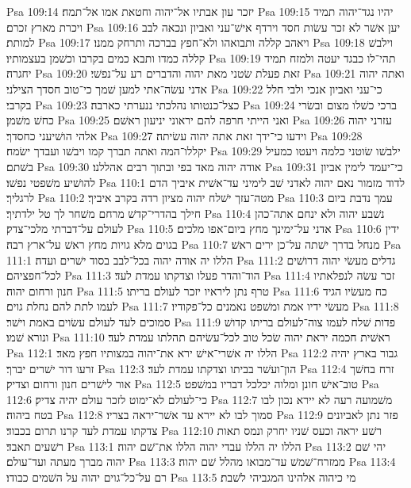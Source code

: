 Psa 109:14  יזכר עון אבתיו אל־יהוה וחטאת אמו אל־תמח׃
Psa 109:15  יהיו נגד־יהוה תמיד ויכרת מארץ זכרם׃
Psa 109:16  יען אשׁר לא זכר עשׂות חסד וירדף אישׁ־עני ואביון ונכאה לבב למותת׃
Psa 109:17  ויאהב קללה ותבואהו ולא־חפץ בברכה ותרחק ממנו׃
Psa 109:18  וילבשׁ קללה כמדו ותבא כמים בקרבו וכשׁמן בעצמותיו׃
Psa 109:19  תהי־לו כבגד יעטה ולמזח תמיד יחגרה׃
Psa 109:20  זאת פעלת שׂטני מאת יהוה והדברים רע על־נפשׁי׃
Psa 109:21  ואתה יהוה אדני עשׂה־אתי למען שׁמך כי־טוב חסדך הצילני׃
Psa 109:22  כי־עני ואביון אנכי ולבי חלל בקרבי׃
Psa 109:23  כצל־כנטותו נהלכתי ננערתי כארבה׃
Psa 109:24  ברכי כשׁלו מצום ובשׂרי כחשׁ משׁמן׃
Psa 109:25  ואני הייתי חרפה להם יראוני יניעון ראשׁם׃
Psa 109:26  עזרני יהוה אלהי הושׁיעני כחסדך׃
Psa 109:27  וידעו כי־ידך זאת אתה יהוה עשׂיתה׃
Psa 109:28  יקללו־המה ואתה תברך קמו ויבשׁו ועבדך ישׂמח׃
Psa 109:29  ילבשׁו שׂוטני כלמה ויעטו כמעיל בשׁתם׃
Psa 109:30  אודה יהוה מאד בפי ובתוך רבים אהללנו׃
Psa 109:31  כי־יעמד לימין אביון להושׁיע משׁפטי נפשׁו׃
Psa 110:1  לדוד מזמור נאם יהוה לאדני שׁב לימיני עד־אשׁית איביך הדם לרגליך׃
Psa 110:2  מטה־עזך ישׁלח יהוה מציון רדה בקרב איביך׃
Psa 110:3  עמך נדבת ביום חילך בהדרי־קדשׁ מרחם משׁחר לך טל ילדתיך׃
Psa 110:4  נשׁבע יהוה ולא ינחם אתה־כהן לעולם על־דברתי מלכי־צדק׃
Psa 110:5  אדני על־ימינך מחץ ביום־אפו מלכים׃
Psa 110:6  ידין בגוים מלא גויות מחץ ראשׁ על־ארץ רבה׃
Psa 110:7  מנחל בדרך ישׁתה על־כן ירים ראשׁ׃
Psa 111:1  הללו יה אודה יהוה בכל־לבב בסוד ישׁרים ועדה׃
Psa 111:2  גדלים מעשׂי יהוה דרושׁים לכל־חפציהם׃
Psa 111:3  הוד־והדר פעלו וצדקתו עמדת לעד׃
Psa 111:4  זכר עשׂה לנפלאתיו חנון ורחום יהוה׃
Psa 111:5  טרף נתן ליראיו יזכר לעולם בריתו׃
Psa 111:6  כח מעשׂיו הגיד לעמו לתת להם נחלת גוים׃
Psa 111:7  מעשׂי ידיו אמת ומשׁפט נאמנים כל־פקודיו׃
Psa 111:8  סמוכים לעד לעולם עשׂוים באמת וישׁר׃
Psa 111:9  פדות שׁלח לעמו צוה־לעולם בריתו קדושׁ ונורא שׁמו׃
Psa 111:10  ראשׁית חכמה יראת יהוה שׂכל טוב לכל־עשׂיהם תהלתו עמדת לעד׃
Psa 112:1  הללו יה אשׁרי־אישׁ ירא את־יהוה במצותיו חפץ מאד׃
Psa 112:2  גבור בארץ יהיה זרעו דור ישׁרים יברך׃
Psa 112:3  הון־ועשׁר בביתו וצדקתו עמדת לעד׃
Psa 112:4  זרח בחשׁך אור לישׁרים חנון ורחום וצדיק׃
Psa 112:5  טוב־אישׁ חונן ומלוה יכלכל דבריו במשׁפט׃
Psa 112:6  כי־לעולם לא־ימוט לזכר עולם יהיה צדיק׃
Psa 112:7  משׁמועה רעה לא יירא נכון לבו בטח ביהוה׃
Psa 112:8  סמוך לבו לא יירא עד אשׁר־יראה בצריו׃
Psa 112:9  פזר נתן לאביונים צדקתו עמדת לעד קרנו תרום בכבוד׃
Psa 112:10  רשׁע יראה וכעס שׁניו יחרק ונמס תאות רשׁעים תאבד׃
Psa 113:1  הללו יה הללו עבדי יהוה הללו את־שׁם יהוה׃
Psa 113:2  יהי שׁם יהוה מברך מעתה ועד־עולם׃
Psa 113:3  ממזרח־שׁמשׁ עד־מבואו מהלל שׁם יהוה׃
Psa 113:4  רם על־כל־גוים יהוה על השׁמים כבודו׃
Psa 113:5  מי כיהוה אלהינו המגביהי לשׁבת׃

